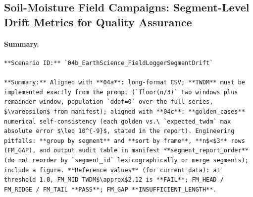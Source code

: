 \subsection{Soil-Moisture Field Campaigns: Segment-Level Drift Metrics for Quality Assurance}

\paragraph{Summary.}
\begin{lstlisting}[basicstyle=\ttfamily\footnotesize,breaklines=true,breakatwhitespace=true]
**Scenario ID:** `04b_EarthScience_FieldLoggerSegmentDrift`

**Summary:** Aligned with **04a**: long-format CSV; **TWDM** must be implemented exactly from the prompt (`floor(n/3)` two windows plus remainder window, population `ddof=0` over the full series, $\varepsilon$ from manifest); aligned with **04c**: **golden_cases** numerical self-consistency (each golden vs.\ `expected_twdm` max absolute error $\leq 10^{-9}$, stated in the report). Engineering pitfalls: **group by segment** and **sort by frame**, **n$<$3** rows (FM_GAP), and output audit table in manifest **segment_report_order** (do not reorder by `segment_id` lexicographically or merge segments); include a figure. **Reference values** (for current data): at threshold 1.0, FM_MID TWDM$\approx$2.12 is **FAIL**; FM_HEAD / FM_RIDGE / FM_TAIL **PASS**; FM_GAP **INSUFFICIENT_LENGTH**.
\end{lstlisting}

